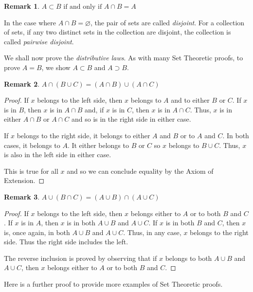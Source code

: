 \documentclass[12pt]{article}
\newtheorem{remark}{Remark}
\begin{document}
\begin{remark}
    $A \subset B \text{ if and only if } A \cap B = A$
\end{remark}

In the case where $A \cap B = \varnothing$, the pair of sets are called \textit{disjoint}. For a collection of sets,
if any two distinct sets in the collection are disjoint, the collection is called \textit{pairwise disjoint}.

We shall now prove the \textit{distributive laws}. As with many Set Theoretic proofs, to prove $A = B$, we show $A \subset B$ and $A \supset B$.

\begin{remark}
    $A \cap (B \cup C) = (A \cap B) \cup (A \cap C)$
\end{remark}
\begin{proof}
    If $x$ belongs to the left side, then $x$ belongs to $A$ and to either $B$ or $C$. If $x$ is in $B$,
    then $x$ is in $A \cap B$ and, if $x$ is in $C$, then $x$ is in $A \cap C$. Thus, $x$ is in either $A \cap B$
    or $A \cap C$ and so is in the right side in either case.

    If $x$ belongs to the right side, it belongs to either $A$ and $B$ or to $A$ and $C$. In both cases,
    it belongs to $A$. It either belongs to $B$ or $C$ so $x$ belongs to $B \cup C$. Thus, $x$ is also in the left side
    in either case.

    This is true for all $x$ and so we can conclude equality by the Axiom of Extension.
\end{proof}

\begin{remark}
    $A \cup (B \cap C) = (A \cup B) \cap (A \cup C)$
\end{remark}
\begin{proof}
    If $x$ belongs to the left side, then $x$ belongs either to $A$ or to both $B$ and $C$. If $x$ is in $A$,
    then $x$ is in both $A \cup B$ and $A \cup C$. If $x$ is in both $B$ and $C$, then $x$ is, once again, in both
    $A \cup B$ and $A \cup C$. Thus, in any case, $x$ belongs to the right side. Thus the right side includes the left.

    The reverse inclusion is proved by observing that if $x$ belongs to both $A \cup B$ and $A \cup C$, then
    $x$ belongs either to $A$ or to both $B$ and $C$.
\end{proof}

Here is a further proof to provide more examples of Set Theoretic proofs.
\end{document}
